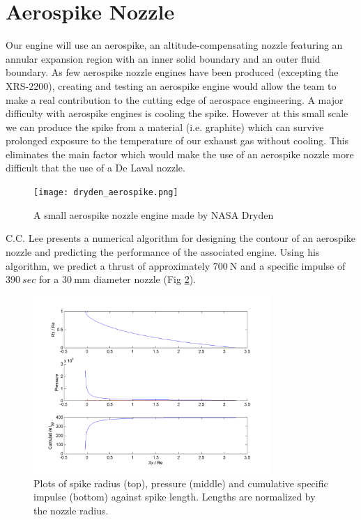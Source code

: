 \documentclass{article}
\begin{document}
\section{Aerospike Nozzle}
Our engine will use an aerospike, an altitude-compensating nozzle featuring an annular expansion region with an inner solid boundary and an outer fluid boundary. As few aerospike nozzle engines have been produced (excepting the XRS-2200), creating and testing an aerospike engine would allow the team to make a real contribution to the cutting edge of aerospace engineering. A major difficulty with aerospike engines is cooling the spike. However at this small scale we can produce the spike from a material (i.e. graphite) which can survive prolonged exposure to the temperature of our exhaust gas without cooling. This eliminates the main factor which would make the use of an aerospike nozzle more difficult that the use of a De Laval nozzle.\\
\begin{figure}[h!]
\centering
\texttt{[image: dryden\_aerospike.png]}
\caption{A small aerospike nozzle engine made by NASA Dryden} 
\label{dryden_aerospike}
\end{figure}
C.C. Lee presents a numerical algorithm for designing the contour of an aerospike nozzle and predicting the performance of the associated engine. Using his algorithm, we predict a thrust of approximately $\SI{700}{\newton}$ and a specific impulse of $\SI{390}{sec}$ for a $\SI{30}{\milli\metre}$ diameter nozzle (Fig \ref{spike_contour}).
\begin{figure}[h!]
\centering
\includegraphics[width = 0.8\textwidth]{spike_contour.png}
\caption{Plots of spike radius (top), pressure (middle) and cumulative specific impulse (bottom) against spike length. Lengths are normalized by the nozzle radius.} 
\label{spike_contour}
\end{figure}
\end{document}
